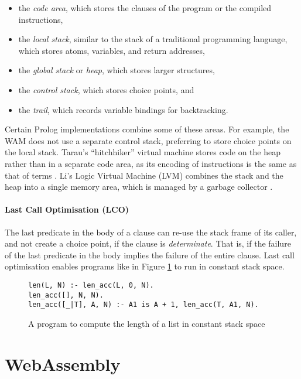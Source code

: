 \begin{itemize}
\item the \emph{code area}, which stores the clauses of the program or the compiled instructions,
\item the \emph{local stack}, similar to the stack of a traditional programming language, which stores atoms, variables, and return addresses,
\item the \emph{global stack} or \emph{heap}, which stores larger structures,
\item the \emph{control stack}, which stores choice points, and
\item the \emph{trail}, which records variable bindings for backtracking.
\end{itemize}

Certain Prolog implementations combine some of these areas. For example, the WAM does not use a separate control stack, preferring to store choice points on the local stack. Tarau's ``hitchhiker'' virtual machine stores code on the heap rather than in a separate code area, as its encoding of instructions is the same as that of terms \cite{tarauHitchhikersGuideReinventing2018}. Li's Logic Virtual Machine (LVM) combines the stack and the heap into a single memory area, which is managed by a garbage collector \cite{liEfficientMemoryManagement2000}.

\paragraph{Last Call Optimisation (LCO)} The last predicate in the body of a clause can re-use the stack frame of its caller, and not create a choice point, if the clause is \emph{determinate}. That is, if the failure of the last predicate in the body implies the failure of the entire clause. Last call optimisation enables programs like in Figure \ref{fig:lco} to run in constant stack space.

\begin{figure}[H]
\begin{center}
\begin{verbatim}
len(L, N) :- len_acc(L, 0, N).
len_acc([], N, N).
len_acc([_|T], A, N) :- A1 is A + 1, len_acc(T, A1, N).
\end{verbatim}
\end{center}
\caption{A program to compute the length of a list in constant stack space}
\label{fig:lco}
\end{figure}

\section{WebAssembly}

